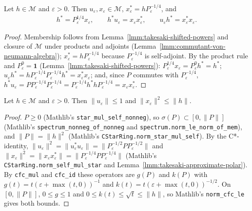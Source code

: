 \begin{lemma}
    \label{lmm:takesaki-approximate-polar}
    \leanok
    Let $h \in \mathcal{M}$ and $\varepsilon > 0$. Then $u_\varepsilon, x_\varepsilon \in \mathcal{M}$, $x_\varepsilon^* = hP_\varepsilon^{-1/4}$, and
    \begin{align}
        h^* = P_\varepsilon^{1/4}x_\varepsilon, \qquad h^*u_\varepsilon = x_\varepsilon x_\varepsilon^*, \qquad u_\varepsilon h^* = x_\varepsilon^*x_\varepsilon.
    \end{align}
\end{lemma}
\begin{proof}
    \leanok
    Membership follows from Lemma~\ref{lmm:takesaki-shifted-powers} and closure of $\mathcal{M}$ under products and adjoints (Lemma~\ref{lmm:commutant-von-neumann-algebra}); $x_\varepsilon^* = hP_\varepsilon^{-1/4}$ because $P_\varepsilon^{-1/4}$ is self-adjoint. By the product rule and $P_\varepsilon^0 = \mathbf{1}$ (Lemma~\ref{lmm:takesaki-shifted-powers}): $P_\varepsilon^{1/4}x_\varepsilon = P_\varepsilon^0h^* = h^*$; $u_\varepsilon h^* = hP_\varepsilon^{-1/4}P_\varepsilon^{-1/4}h^* = x_\varepsilon^*x_\varepsilon$; and, since $P$ commutes with $P_\varepsilon^{-1/4}$, $h^*u_\varepsilon = PP_\varepsilon^{-1/4}P_\varepsilon^{-1/4} = P_\varepsilon^{-1/4}h^*hP_\varepsilon^{-1/4} = x_\varepsilon x_\varepsilon^*$.
\end{proof}

\begin{lemma}
    \label{lmm:takesaki-approx-polar-norms}
    \leanok
    Let $h \in \mathcal{M}$ and $\varepsilon > 0$. Then $\|u_\varepsilon\| \le 1$ and $\|x_\varepsilon\|^2 \le \|h\|$.
\end{lemma}
\begin{proof}
    \leanok
    $P \ge 0$ (Mathlib's \texttt{star\_mul\_self\_nonneg}), so $\sigma(P) \subset [0, \|P\|]$ (Mathlib's \texttt{spectrum\_nonneg\_of\_nonneg} and \texttt{spectrum.norm\_le\_norm\_of\_mem}), and $\|P\| = \|h\|^2$ (Mathlib's \texttt{CStarRing.norm\_star\_mul\_self}). By the C*-identity, $\|u_\varepsilon\|^2 = \|u_\varepsilon^*u_\varepsilon\| = \|P_\varepsilon^{-1/2}PP_\varepsilon^{-1/2}\|$ and $\|x_\varepsilon\|^2 = \|x_\varepsilon x_\varepsilon^*\| = \|P_\varepsilon^{-1/4}PP_\varepsilon^{-1/4}\|$ (Mathlib's \texttt{CStarRing.norm\_self\_mul\_star} and Lemma~\ref{lmm:takesaki-approximate-polar}). By \texttt{cfc\_mul} and \texttt{cfc\_id} these operators are $g(P)$ and $k(P)$ with $g(t) = t(\varepsilon + \max(t, 0))^{-1}$ and $k(t) = t(\varepsilon + \max(t, 0))^{-1/2}$. On $[0, \|P\|]$, $0 \le g \le 1$ and $0 \le k(t) \le \sqrt{t} \le \|h\|$, so Mathlib's \texttt{norm\_cfc\_le} gives both bounds.
\end{proof}

